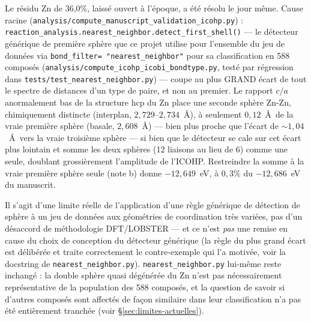 Le résidu Zn de 36,0\%, laissé ouvert à l'époque, a été résolu le jour
même. Cause racine
(\texttt{analysis/compute\_manuscript\_validation\_icohp.py}) :
\texttt{reaction\_analysis.nearest\_neighbor.detect\_first\_shell()}
--- le détecteur générique de première sphère que ce projet utilise
pour l'ensemble du jeu de données via \texttt{bond\_filter=
"nearest\_neighbor"} pour sa classification en 588 composés
(\texttt{analysis/compute\_icohp\_icobi\_bondtype.py}, testé par
régression dans \texttt{tests/test\_nearest\_neighbor.py}) --- coupe au
plus GRAND écart de tout le spectre de distances d'un type de paire, et
non au premier. Le rapport $c/a$ anormalement bas de la structure hcp
du Zn place une seconde sphère Zn-Zn, chimiquement distincte
(interplan, $2{,}729$--$2{,}734$~\AA), à seulement $0{,}12$~\AA\ de la
vraie première sphère (basale, $2{,}608$~\AA) --- bien plus proche que
l'écart de $\sim\!1{,}04$~\AA\ vers la vraie troisième sphère --- si
bien que le détecteur se cale sur cet écart plus lointain et somme les
deux sphères (12 liaisons au lieu de 6) comme une seule, doublant
grossièrement l'amplitude de l'ICOHP. Restreindre la somme à la vraie
première sphère seule (note b) donne $-12{,}649$~eV, à $0{,}3\%$ du
$-12{,}686$~eV du manuscrit.

Il s'agit d'une limite réelle de l'application d'une règle générique de
détection de sphère à un jeu de données aux géométries de coordination
très variées, pas d'un désaccord de méthodologie DFT/LOBSTER --- et ce
n'est \emph{pas} une remise en cause du choix de conception du
détecteur générique (la règle du plus grand écart est délibérée et
traite correctement le contre-exemple qui l'a motivée, voir la
docstring de \texttt{nearest\_neighbor.py}). \texttt{nearest\_neighbor.py}
lui-même reste inchangé : la double sphère quasi dégénérée du Zn n'est
pas nécessairement représentative de la population des 588 composés,
et la question de savoir si d'autres composés sont affectés de façon
similaire dans leur classification n'a pas été entièrement tranchée
(voir \S\ref{sec:limites-actuelles}).

